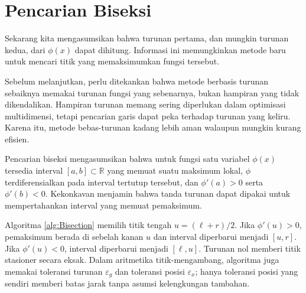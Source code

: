 \section{Pencarian Biseksi}
\begin{remark} Sekarang kita mengasumsikan bahwa turunan pertama, dan mungkin turunan kedua, dari $\phi(x)$ dapat dihitung. Informasi ini memungkinkan metode baru untuk mencari titik yang memaksimumkan fungsi tersebut.
\end{remark}

\begin{remark} Sebelum melanjutkan, perlu ditekankan bahwa metode berbasis turunan sebaiknya memakai turunan fungsi yang sebenarnya, bukan hampiran yang tidak dikendalikan. Hampiran turunan memang sering diperlukan dalam optimisasi multidimensi, tetapi pencarian garis dapat peka terhadap turunan yang keliru. Karena itu, metode bebas-turunan kadang lebih aman walaupun mungkin kurang efisien.
\end{remark}

\begin{remark} Pencarian biseksi mengasumsikan bahwa untuk fungsi satu variabel $\phi(x)$ tersedia interval $[a,b]\subset\mathbb{R}$ yang memuat suatu maksimum lokal, $\phi$ terdiferensialkan pada interval tertutup tersebut, dan $\phi'(a)>0$ serta $\phi'(b)<0$. Kekonkavan menjamin bahwa tanda turunan dapat dipakai untuk mempertahankan interval yang memuat pemaksimum.
\end{remark}

\begin{remark} Algoritma \ref{alg:Bisection} memilih titik tengah $u=(\ell+r)/2$. Jika $\phi'(u)>0$, pemaksimum berada di sebelah kanan $u$ dan interval diperbarui menjadi $[u,r]$. Jika $\phi'(u)<0$, interval diperbarui menjadi $[\ell,u]$. Turunan nol memberi titik stasioner secara eksak. Dalam aritmetika titik-mengambang, algoritma juga memakai toleransi turunan $\varepsilon_g$ dan toleransi posisi $\varepsilon_x$; hanya toleransi posisi yang sendiri memberi batas jarak tanpa asumsi kelengkungan tambahan.
\end{remark}


